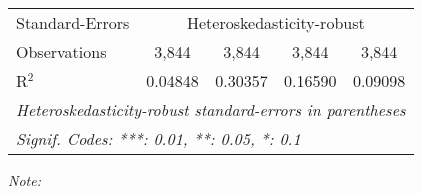\begin{table}[htbp!]
\begin{adjustbox}{width = 1\textwidth, max height = 0.95\textheight, center}
\begin{threeparttable}[b]
\begin{tabular}{lcccc}
            \midrule 
            Standard-Errors & \multicolumn{4}{c}{Heteroskedasticity-robust} \\ 
            Observations         & 3,844                          & 3,844                          & 3,844                          & 3,844\\  
            R$^2$                & 0.04848                        & 0.30357                        & 0.16590                        & 0.09098\\  
            \midrule \midrule
            \multicolumn{5}{l}{\emph{Heteroskedasticity-robust standard-errors in parentheses}}\\
            \multicolumn{5}{l}{\emph{Signif. Codes: ***: 0.01, **: 0.05, *: 0.1}}\\
         \end{tabular}
         
         \begin{tablenotes}\item \medskip \textit{Note:}
         \end{tablenotes}
      \end{threeparttable}
   \end{adjustbox}
\end{table}


